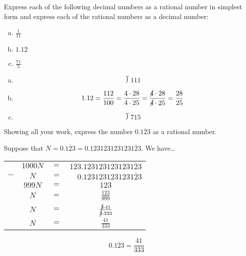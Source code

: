 \documentclass[11pt,letterpaper]{article}
\begin{document}

 Express each of the following decimal numbers as a rational number in simplest form and express each of the rational numbers as a decimal number:
	\begin{enumerate}[(a)]
	\item $\frac{1}{11}$
	\item $1.12$
	\item $\frac{71}{5}$
	\end{enumerate} \pspace

\sol 
\begin{enumerate}[(a)]
\item 
	\[
	\longdivision{1}{11} %
	\] \pspace

\item 
	\[
	1.12= \dfrac{112}{100}= \dfrac{4 \cdot 28}{4 \cdot 25}= \dfrac{\cancel{4} \cdot 28}{\cancel{4} \cdot 25}= \dfrac{28}{25}
	\] \pspace

\item 
	\[
	\longdivision{71}{5} %
	\]
\end{enumerate}



\newpage



 Showing all your work, express the number $0.\overline{123}$ as a rational number. \pspace

\sol Suppose that $N= 0.\overline{123}= 0.123123123123\overline{123}$. We have\dots
	\begin{table}[!ht]
	\centering\small
	\begin{tabular}{rccc}
	& $1000N$ & $=$ & $123.123123123123\overline{123}$ \\ 
	$-$ & $N$ & $=$ & $\phantom{12}0.123123123123\overline{123}$ \\ \hline
	& $999N$ & $=$ & $123$ \\[0.1cm]
	& $N$ & $=$ & $\frac{123}{999}$ \\[0.1cm]
	& $N$ & $=$ & $\frac{\cancel{3} \cdot 41}{\cancel{3} \cdot 333}$ \\[0.1cm]
	& $N$ & $=$ & $\frac{41}{333}$ 
	\end{tabular}
	\end{table} \par

	\[
	0.\overline{123}= \dfrac{41}{333}
	\]
\end{document}
